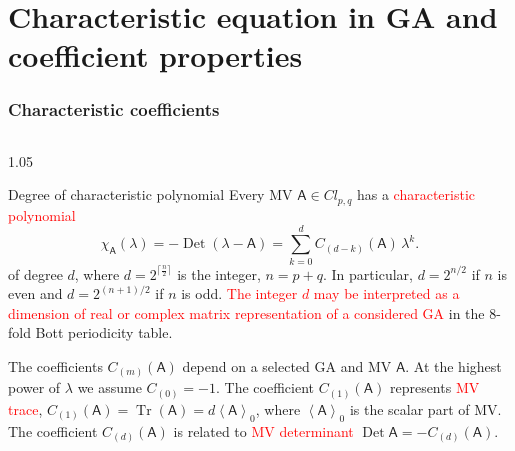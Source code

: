 \documentclass[xcolor=table,hyperref={pdfpagemode=FullScreen}]{beamer}
\newcommand{\cl}[2]{\ensuremath{\mathit{Cl}_{#1,#2}}} %
\def\m#1{\mathsf{#1}} %
\def\m#1{\mathsf{#1}}%
\DeclareMathOperator{\Det}{Det} %
\newcommand{\red}[1]{\textcolor{red}{#1}}
\begin{document}
\section[Characteristic coefficients;]{Characteristic equation in GA  and coefficient  properties}
\begin{frame}
\frametitle<presentation>{Characteristic coefficients}
\vskip -0pt
\begin{columns}[t]
\begin{column}{1.05\textwidth}
\begin{block}{Degree of characteristic polynomial}
  Every MV $\m{A}\in\cl{p}{q}$ has a \red{characteristic polynomial}
\abovedisplayskip=6pt
\belowdisplayskip=6pt
\begin{equation*}\label{CharPolyDef}
  \chi_{\m{A}}(\lambda)=-\Det(\lambda -\m{A})=\sum_{k=0}^{d} C_{(d-k)}(\m{A})\, \lambda ^k.
\end{equation*}
of degree $d$, where
$d=2^{\lceil\tfrac{n}{2}\rceil}$ is the integer, $n=p+q$. In
particular, $d=2^{n/2}$ if $n$ is even and $d=2^{(n+1)/2}$ if $n$
is odd. \red{The integer $d$  may be interpreted as a dimension of
real or complex matrix representation of a considered GA} in the
8-fold Bott periodicity table.\newline 

\small
The coefficients $C_{(m)}(\m{A})$  depend on a selected GA and  MV $\m{A}$. At the
highest power of  $\lambda$ we assume $C_{(0)}=-1$. The
  coefficient $C_{(1)}(\m{A})$ represents \red{MV trace},
  $C_{(1)}(\m{A})=\mathop{\mathrm{Tr}}(\m{A})=d \left\langle\m{A}\right\rangle_{0}$,
where $\left\langle\m{A}\right\rangle_{0}$ is the scalar
  part of MV. The coefficient $C_{(d)}(\m{A})$ is related to \red{MV
  determinant} $\Det\m{A}=-C_{(d)}(\m{A})$.
\end{block}
\end{column}
\end{columns}
\end{frame}
\end{document}
